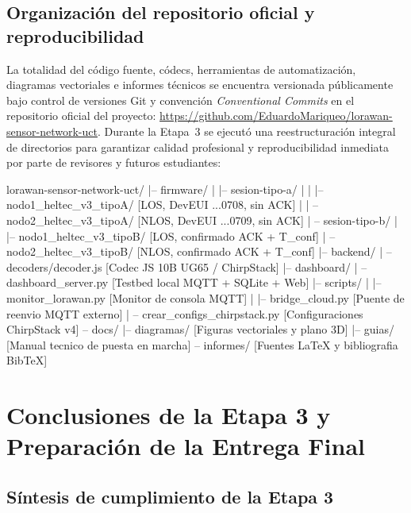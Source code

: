 \documentclass[12pt,oneside,openany,spanish,oldfontcommands]{memoir}
\begin{document}
\section{Organización del repositorio oficial y reproducibilidad}\label{sec:repositorio-git}

La totalidad del código fuente, códecs, herramientas de automatización, diagramas vectoriales e
informes técnicos se encuentra versionada públicamente bajo control de versiones Git y convención
\textit{Conventional Commits} en el repositorio oficial del proyecto:
\url{https://github.com/EduardoMariqueo/lorawan-sensor-network-uct}. Durante la Etapa~3 se ejecutó
una reestructuración integral de directorios para garantizar calidad profesional y reproducibilidad
inmediata por parte de revisores y futuros estudiantes:

\begin{example}
lorawan-sensor-network-uct/
|-- firmware/
|   |-- sesion-tipo-a/
|   |   |-- nodo1_heltec_v3_tipoA/   [LOS, DevEUI ...0708, sin ACK]
|   |   -- nodo2_heltec_v3_tipoA/   [NLOS, DevEUI ...0709, sin ACK]
|   -- sesion-tipo-b/
|       |-- nodo1_heltec_v3_tipoB/   [LOS, confirmado ACK + T_conf]
|       -- nodo2_heltec_v3_tipoB/   [NLOS, confirmado ACK + T_conf]
|-- backend/
|   -- decoders/decoder.js          [Codec JS 10B UG65 / ChirpStack]
|-- dashboard/
|   -- dashboard_server.py          [Testbed local MQTT + SQLite + Web]
|-- scripts/
|   |-- monitor_lorawan.py           [Monitor de consola MQTT]
|   |-- bridge_cloud.py              [Puente de reenvio MQTT externo]
|   -- crear_configs_chirpstack.py  [Configuraciones ChirpStack v4]
-- docs/
      |-- diagramas/                   [Figuras vectoriales y plano 3D]
      |-- guias/                       [Manual tecnico de puesta en marcha]
      -- informes/                    [Fuentes LaTeX y bibliografia BibTeX]
\end{example}

\chapter{Conclusiones de la Etapa 3 y Preparación de la Entrega Final}\label{cap:conclusiones-etapa3}

\section{Síntesis de cumplimiento de la Etapa 3}
\end{document}
